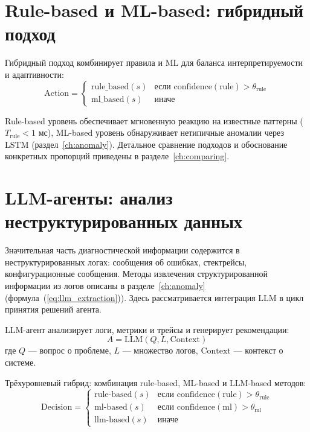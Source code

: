 \section{Rule-based и ML-based: гибридный подход}

Гибридный подход комбинирует правила и ML для баланса интерпретируемости и адаптивности:
\begin{equation}
\text{Action} = \begin{cases}
\text{rule\_based}(s) & \text{если } \text{confidence}(\text{rule}) > \theta_{\text{rule}} \\
\text{ml\_based}(s) & \text{иначе}
\end{cases}
\label{eq:hybrid_approach}
\end{equation}

Rule-based уровень обеспечивает мгновенную реакцию на известные паттерны ($T_{\text{rule}} < 1$ мс), ML-based уровень обнаруживает нетипичные аномалии через LSTM (раздел~\ref{ch:anomaly}). Детальное сравнение подходов и обоснование конкретных пропорций приведены в разделе~\ref{ch:comparing}.

\section{LLM-агенты: анализ неструктурированных данных}

Значительная часть диагностической информации содержится в неструктурированных логах: сообщения об ошибках, стектрейсы, конфигурационные сообщения. Методы извлечения структурированной информации из логов описаны в разделе~\ref{ch:anomaly} (формула~(\ref{eq:llm_extraction})). Здесь рассматривается интеграция LLM в цикл принятия решений агента.

LLM-агент анализирует логи, метрики и трейсы и генерирует рекомендации:
\begin{equation}
A = \text{LLM}(Q, L, \text{Context})
\label{eq:llm_qa}
\end{equation}
где $Q$ --- вопрос о проблеме, $L$ --- множество логов, $\text{Context}$ --- контекст о системе.

Трёхуровневый гибрид: комбинация rule-based, ML-based и LLM-based методов:
\begin{equation}
\text{Decision} = \begin{cases}
\text{rule-based}(s) & \text{если } \text{confidence}(\text{rule}) > \theta_{\text{rule}} \\
\text{ml-based}(s) & \text{если } \text{confidence}(\text{ml}) > \theta_{\text{ml}} \\
\text{llm-based}(s) & \text{иначе}
\end{cases}
\label{eq:hybrid_decision}
\end{equation}

